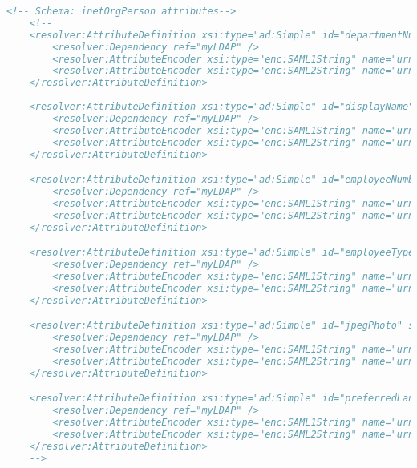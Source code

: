 \begin{lstlisting}[language=xml]
    <!-- Schema: inetOrgPerson attributes-->
    <!--
    <resolver:AttributeDefinition xsi:type="ad:Simple" id="departmentNumber" sourceAttributeID="departmentNumber">
        <resolver:Dependency ref="myLDAP" />
        <resolver:AttributeEncoder xsi:type="enc:SAML1String" name="urn:mace:dir:attribute-def:departmentNumber" />
        <resolver:AttributeEncoder xsi:type="enc:SAML2String" name="urn:oid:2.16.840.1.113730.3.1.2" friendlyName="departmentNumber" />
    </resolver:AttributeDefinition>
    
    <resolver:AttributeDefinition xsi:type="ad:Simple" id="displayName" sourceAttributeID="displayName">
        <resolver:Dependency ref="myLDAP" />
        <resolver:AttributeEncoder xsi:type="enc:SAML1String" name="urn:mace:dir:attribute-def:displayName" />
        <resolver:AttributeEncoder xsi:type="enc:SAML2String" name="urn:oid:2.16.840.1.113730.3.1.241" friendlyName="displayName" />
    </resolver:AttributeDefinition> 

    <resolver:AttributeDefinition xsi:type="ad:Simple" id="employeeNumber" sourceAttributeID="employeeNumber">
        <resolver:Dependency ref="myLDAP" />
        <resolver:AttributeEncoder xsi:type="enc:SAML1String" name="urn:mace:dir:attribute-def:employeeNumber" />
        <resolver:AttributeEncoder xsi:type="enc:SAML2String" name="urn:oid:2.16.840.1.113730.3.1.3" friendlyName="employeeNumber" />
    </resolver:AttributeDefinition>

    <resolver:AttributeDefinition xsi:type="ad:Simple" id="employeeType" sourceAttributeID="employeeType">
        <resolver:Dependency ref="myLDAP" />
        <resolver:AttributeEncoder xsi:type="enc:SAML1String" name="urn:mace:dir:attribute-def:employeeType" />
        <resolver:AttributeEncoder xsi:type="enc:SAML2String" name="urn:oid:2.16.840.1.113730.3.1.4" friendlyName="employeeType" />
    </resolver:AttributeDefinition>

    <resolver:AttributeDefinition xsi:type="ad:Simple" id="jpegPhoto" sourceAttributeID="jpegPhoto">
        <resolver:Dependency ref="myLDAP" />
        <resolver:AttributeEncoder xsi:type="enc:SAML1String" name="urn:mace:dir:attribute-def:jpegPhoto" />
        <resolver:AttributeEncoder xsi:type="enc:SAML2String" name="urn:oid:0.9.2342.19200300.100.1.60" friendlyName="jpegPhoto" />
    </resolver:AttributeDefinition>

    <resolver:AttributeDefinition xsi:type="ad:Simple" id="preferredLanguage" sourceAttributeID="preferredLanguage">
        <resolver:Dependency ref="myLDAP" />
        <resolver:AttributeEncoder xsi:type="enc:SAML1String" name="urn:mace:dir:attribute-def:preferredLanguage" />
        <resolver:AttributeEncoder xsi:type="enc:SAML2String" name="urn:oid:2.16.840.1.113730.3.1.39" friendlyName="preferredLanguage" />
    </resolver:AttributeDefinition>
    -->


\end{lstlisting}
